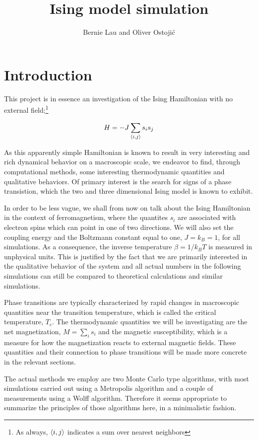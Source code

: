 \documentclass[11pt,a4paper]{article}
\title{Ising model simulation}
\date{}
\author{Bernie Lau and Oliver Ostoji\'c}
\DeclarePairedDelimiter{\avg}{\langle}{\rangle}
\begin{document}
\maketitle

\section{Introduction}

This project is in essence an investigation of the Ising Hamiltonian with no external field;\footnote{As always,
$\avg{i,j}$ indicates a sum over nearest neighbors}

\begin{equation}\label{eq:Hamiltonian}
    H = -J \sum_{\avg*{i,j}} s_i s_j
\end{equation}

As this apparently simple Hamiltonian is known to result in very interesting and rich dynamical behavior on a 
 macroscopic scale, we endeavor to find, through computational methods, some interesting thermodynamic quantities
 and qualitative behaviors. Of primary interest is the search for signs of a phase transistion, which the two and three
 dimensional Ising model is known to exhibit.

 In order to be less vague, we shall from now on talk about the Ising Hamiltonian
 in the context of ferromagnetism, where the quantites $s_i$ are associated with electron spins which can point in one of two
 directions. We will also set the coupling energy and the Boltzmann constant equal to one, 
 $J = k_B = 1$, for all simulations. As a consequence, the inverse temperature $\beta = 1/k_BT$ is measured in unphysical
 units. This is justified by the
 fact that  we are primarily interested in the qualitative behavior of the system and all actual numbers in the following
 simulations can still be compared to theoretical calculations and similar simulations.

 Phase transitions are typically characterized by rapid changes in macroscopic quantities near the transition temperature, which
 is called the critical temperature, $T_c$. The thermodynamic quantities we will be investigating are the net magnetization,
 $M = \sum_i s_i$ and the magnetic susceptibility, which is a measure for how the magnetization reacts to external magnetic fields.
 These quantities and their connection to phase transitions will be made more concrete in the relevant sections. 

 The actual methods we employ are two Monte Carlo type algorithms, with most simulations carried out using a 
 Metropolis algorithm and a couple of measurements using a Wolff algorithm. Therefore it seems appropriate to summarize the
 principles of those algorithms here, in a minimalistic fashion.
\end{document}
